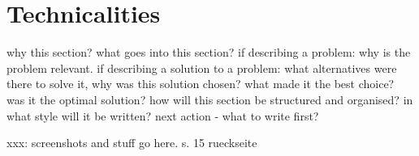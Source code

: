 
\chapter{Technicalities}
\label{chap:app:technicalities}

why this section? 
what goes into this section?
  if describing a problem: why is the problem relevant.
  if describing a solution to a problem: what alternatives were
  there to solve it, why was this solution chosen? what made it the best
  choice? was it the optimal solution?
how will this section be structured and organised?
in what style will it be written?
next action - what to write first?


xxx: screenshots and stuff go here.
s. 15 rueckseite

